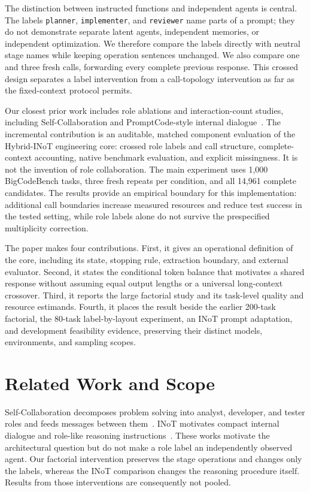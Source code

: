 The distinction between instructed functions and independent agents is central. The labels \texttt{planner}, \texttt{implementer}, and \texttt{reviewer} name parts of a prompt; they do not demonstrate separate latent agents, independent memories, or independent optimization. We therefore compare the labels directly with neutral stage names while keeping operation sentences unchanged. We also compare one and three fresh calls, forwarding every complete previous response. This crossed design separates a label intervention from a call-topology intervention as far as the fixed-context protocol permits.

Our closest prior work includes role ablations and interaction-count studies, including Self-Collaboration and PromptCode-style internal dialogue~\cite{dong2023selfcollaboration,sun2025inot}. The incremental contribution is an auditable, matched component evaluation of the Hybrid-INoT engineering core: crossed role labels and call structure, complete-context accounting, native benchmark evaluation, and explicit missingness. It is not the invention of role collaboration. The main experiment uses 1,000 BigCodeBench tasks, three fresh repeats per condition, and all 14,961 complete candidates. The results provide an empirical boundary for this implementation: additional call boundaries increase measured resources and reduce test success in the tested setting, while role labels alone do not survive the prespecified multiplicity correction.

The paper makes four contributions. First, it gives an operational definition of the core, including its state, stopping rule, extraction boundary, and external evaluator. Second, it states the conditional token balance that motivates a shared response without assuming equal output lengths or a universal long-context crossover. Third, it reports the large factorial study and its task-level quality and resource estimands. Fourth, it places the result beside the earlier 200-task factorial, the 80-task label-by-layout experiment, an INoT prompt adaptation, and development feasibility evidence, preserving their distinct models, environments, and sampling scopes.

\section{Related Work and Scope}
Self-Collaboration decomposes problem solving into analyst, developer, and tester roles and feeds messages between them~\cite{dong2023selfcollaboration}. INoT motivates compact internal dialogue and role-like reasoning instructions~\cite{sun2025inot}. These works motivate the architectural question but do not make a role label an independently observed agent. Our factorial intervention preserves the stage operations and changes only the labels, whereas the INoT comparison changes the reasoning procedure itself. Results from those interventions are consequently not pooled.

